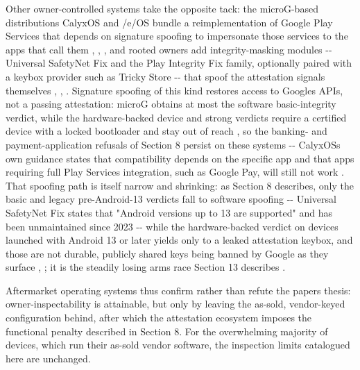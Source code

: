 \documentclass[
]{article}
\begin{document}
Other owner-controlled systems take the opposite tack: the microG-based
distributions CalyxOS and /e/OS bundle a reimplementation of Google Play
Services that depends on signature spoofing to impersonate those
services to the apps that call them \citep{microg-gmscore},
\citep{calyxos-microg}, \citep{eos-microg}, and rooted owners add
integrity-masking modules -\/- Universal SafetyNet Fix and the Play
Integrity Fix family, optionally paired with a keybox provider such as
Tricky Store -\/- that spoof the attestation signals themselves
\citep{safetynet-fix}, \citep{playintegrityfork}, \citep{tricky-store}.
Signature spoofing of this kind restores access to
Google\textquotesingle s APIs, not a passing attestation: microG obtains
at most the software basic-integrity verdict, while the hardware-backed
device and strong verdicts require a certified device with a locked
bootloader and stay out of reach \citep{eos-microg}, so the banking- and
payment-application refusals of Section 8 persist on these systems -\/-
CalyxOS\textquotesingle s own guidance states that compatibility depends
on the specific app and that apps requiring full Play Services
integration, such as Google Pay, will still not work
\citep{calyxos-banking}. That spoofing path is itself narrow and
shrinking: as Section 8 describes, only the basic and legacy
pre-Android-13 verdicts fall to software spoofing -\/- Universal
SafetyNet Fix states that "Android versions up to 13 are supported" and
has been unmaintained since 2023 \citep{safetynet-fix} -\/- while the
hardware-backed verdict on devices launched with Android 13 or later
yields only to a leaked attestation keybox, and those are not durable,
publicly shared keys being banned by Google as they surface
\citep{playintegrityfork}, \citep{tricky-store}; it is the steadily
losing arms race Section 13 describes \citep{nguyen-vu-android-rooting}.

Aftermarket operating systems thus confirm rather than refute the
paper\textquotesingle s thesis: owner-inspectability is attainable, but
only by leaving the as-sold, vendor-keyed configuration behind, after
which the attestation ecosystem imposes the functional penalty described
in Section 8. For the overwhelming majority of devices, which run their
as-sold vendor software, the inspection limits catalogued here are
unchanged.
\end{document}
